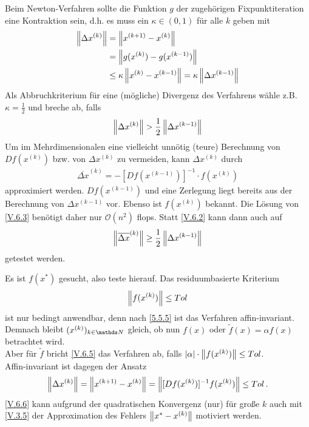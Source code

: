 Beim Newton-Verfahren sollte die Funktion $g$ der zugehörigen
Fixpunktiteration eine Kontraktion sein, d.h. es muss ein 
$\kappa \in (0,1)$ für alle $k$ geben mit
\begin{align}\nonumber
\left\| \Delta x^{(k)} \right\|&=\left\| x^{(k+1)}-x^{(k)} \right\| \\ \nonumber
&= \left\| g(x^{(k)})-g(x^{(k-1)}) \right\|\\
&\leq \kappa\left\| x^{(k)}-x^{(k-1)} \right\| = \kappa \left\| \Delta x^{(k-1)} \right\|
\label{V.6.1}
\end{align}
Als Abbruchkriterium für eine (mögliche) Divergenz des Verfahrens wähle z.B.
$\kappa=\frac{1}{2}$ und breche ab, falls 
\begin{gather}
\nn{\Delta x^{(k)}}>\frac{1}{2}\nn{\Delta x^{(k-1)}}
\label{V.6.2}
\end{gather}
Um im Mehrdimensionalen eine vielleicht unnötig (teure) Berechnung
von $Df(x^{(k)})$ bzw. von $\Delta x^{(k)}$ zu vermeiden, kann 
$\Delta x^{(k)}$ durch 
\begin{gather}
\overline{\Delta x}^{(k)} = -[Df(x^{(k-1)})]^{-1}\cdot f(x^{(k)})
\label{V.6.3}
\end{gather}
approximiert werden.
$Df(x^{(k-1)})$ und eine Zerlegung liegt bereits aus der Berechnung von $\Delta x^{(k-1)}$ vor.
Ebenso ist $f(x^{(k)})$ bekannt.
Die Lösung von \eqref{V.6.3} benötigt daher nur $\mathcal{O}(n^2)$ flops.
Statt \eqref{V.6.2} kann dann auch auf 
\begin{gather}
\left\| \overline{\Delta x}^{(k)} \right\| \geq \frac{1}{2} \left\| \Delta x^{(k-1)} \right\|
\label{V.6.4}
\end{gather}
getestet werden.


Es ist $f(x^{*})$ gesucht, also teste hierauf. Das residuumbasierte Kriterium
\begin{gather}
\left\| f(x^{(k)}) \right\|\leq Tol
\label{V.6.5}
\end{gather}
ist nur bedingt anwendbar, denn nach \ref{5.5.5} ist das Verfahren affin-invariant.
Demnach bleibt $(x^{(k)})_{k\in\N}$ gleich,
ob nun $f(x)$ oder $\widetilde{f}(x) =\alpha f(x) $ betrachtet wird.\\
Aber für $\widetilde{f}$ bricht \eqref{V.6.5} das Verfahren ab, 
falls $|\alpha|\cdot \left\| f(x^{(k)}) \right\| \leq Tol$. \\
Affin-invariant ist dagegen der Ansatz
\begin{gather}
\left\| \Delta x^{(k)} \right\|= \left\| x^{(k+1)}-x^{(k)} \right\| 
= \left\| [Df(x^{(k)})]^{-1}f(x^{(k)}) \right\| 
\leq Tol \, .
\label{V.6.6}
\end{gather}
\eqref{V.6.6} kann aufgrund der quadratischen Konvergenz (nur) für 
große $k$ auch mit \eqref{V.3.5} der Approximation des Fehlers 
$\left\| x^{*}-x^{(k)} \right\| $ motiviert werden.


